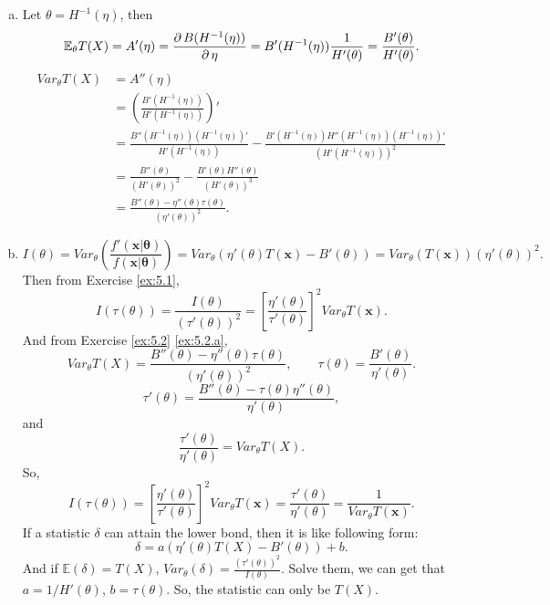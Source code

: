 \begin{solution}
    \begin{enumerate}[(a)]
        \item \label{ex:5.2.a} Let $\theta=H^{-1}(\eta)$, then 
        \[
            \mathbb{E}_\theta T(X) = A'(\eta) =\frac{\partial\, B(H^{-1}(\eta))}{\partial\, \eta}=B'(H^{-1}(\eta))\frac{1}{H'(\theta)}=\frac{B'(\theta)}{H'(\theta)}. 
        \]
        \[
            \begin{aligned}
                Var_\theta T(X)&=A''(\eta)\\
                &=\left(\frac{B'(H^{-1}(\eta))}{H'(H^{-1}(\eta))}\right)'\\
                &=\frac{B''(H^{-1}(\eta))(H^{-1}(\eta))'}{H'(H^{-1}(\eta))}-\frac{B'(H^{-1}(\eta))H''(H^{-1}(\eta))(H^{-1}(\eta))'}{\left(H'(H^{-1}(\eta))\right)^2}\\
                &=\frac{B''(\theta)}{(H'(\theta))^2}-\frac{B'(\theta)H''(\theta)}{(H'(\theta))^3}\\
                &=\frac{B''(\theta)-\eta''(\theta)\tau(\theta)}{(\eta'(\theta))^2}. 
            \end{aligned}
        \]
        \item \[
            I(\theta)=Var_\theta\left(\frac{f'(\mathbf{x|\theta})}{f(\mathbf{x|\theta})}\right)=Var_{\theta}(\eta'(\theta)T(\mathbf{x})-B'(\theta))=Var_\theta(T(\mathbf{x}))(\eta'(\theta))^2. 
        \]
        Then from Exercise \ref{ex:5.1}, 
        \begin{equation}
            I(\tau(\theta))=\frac{I(\theta)}{(\tau'(\theta))^2}=\left[\frac{\eta'(\theta)}{\tau'(\theta)}\right]^2Var_\theta T(\mathbf{x}). 
            \label{eq:5.2.1}
        \end{equation}
        And from Exercise \ref{ex:5.2} \ref{ex:5.2.a},
        \[
            Var_\theta T(X)=\frac{B''(\theta)-\eta''(\theta)\tau(\theta)}{(\eta'(\theta))^2}, \qquad \tau(\theta)=\frac{B'(\theta)}{\eta'(\theta)}. 
        \]
        \[
            \tau'(\theta)=\frac{B''(\theta)-\tau(\theta)\eta''(\theta)}{\eta'(\theta)}, 
        \]
        and \[
            \frac{\tau'(\theta)}{\eta'(\theta)}=Var_\theta T(X).
        \]
        So, 
        \[
            I(\tau(\theta))=\left[\frac{\eta'(\theta)}{\tau'(\theta)}\right]^2Var_\theta T(\mathbf{x})=\frac{\tau'(\theta)}{\eta'(\theta)}=\frac{1}{Var_\theta T(\mathbf{x})}. 
        \]
        If a statistic $\delta$ can attain the lower bond, then it is like following form: 
        \[
           \delta=a\left(\eta'(\theta)T(X)-B'(\theta)\right)+b.
        \]
        And if $\mathbb{E}(\delta)=T(X)$, $Var_\theta(\delta)=\frac{(\tau'(\theta))^2}{I(\theta)}$. Solve them, we can get that $a=1/H'(\theta)$, $b=\tau(\theta)$. So, the statistic can only be $T(X)$. 
    \end{enumerate}
\end{solution}

